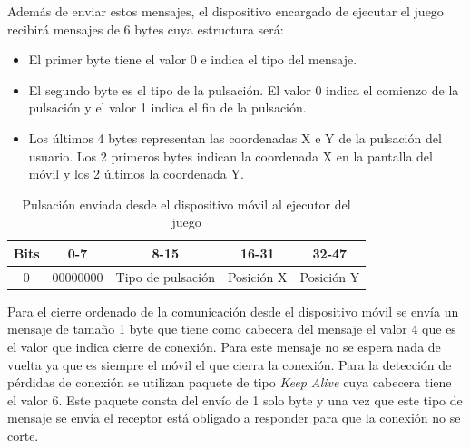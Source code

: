 Adem\'as de enviar estos mensajes, el dispositivo encargado de ejecutar el juego recibir\'a mensajes de 6 bytes cuya estructura ser\'a:
\begin {itemize}
\item El primer byte tiene el valor 0 e indica el tipo del mensaje.
\item El segundo byte es el tipo de la pulsaci\'on. El valor 0 indica el comienzo de la pulsaci\'on y el valor 1 indica el fin de la pulsaci\'on.
\item Los \'ultimos 4 bytes representan las coordenadas X e Y de la pulsaci\'on del usuario. Los 2 primeros bytes indican la coordenada X en la pantalla del m\'ovil y los 2 \'ultimos la coordenada Y.
\end {itemize}

\begin{table}[h!]
\centering
\begin{tabular}{|l|c|c|c|c|} 
\hline
Bits                    & 0-7               & 8-15                            & 16-31 & 32-47 \\ 
\hline
\multicolumn{1}{|c|}{0} & 00000000 & Tipo de pulsaci\'on & \multicolumn{1}{l|}{Posici\'on X} & \multicolumn{1}{l|}{Posici\'on Y}  \\
\hline
\end{tabular}
\caption{Pulsaci\'on enviada desde el dispositivo m\'ovil al ejecutor del juego}
\label{table:2}
\end{table}

Para el cierre ordenado de la comunicaci\'on desde el dispositivo m\'ovil se env\'ia un mensaje de tama\~no 1 byte que tiene como cabecera del mensaje el valor 4 que es el valor que indica cierre de conexi\'on. Para este mensaje no se espera nada de vuelta ya que es siempre el m\'ovil el que cierra la conexi\'on. Para la detecci\'on de p\'erdidas de conexi\'on se utilizan paquete de tipo \textit{Keep Alive} cuya cabecera tiene el valor 6. Este paquete consta del env\'io de 1 solo byte y una vez que este tipo de mensaje se env\'ia el receptor est\'a obligado a responder para que la conexi\'on no se corte.\\


